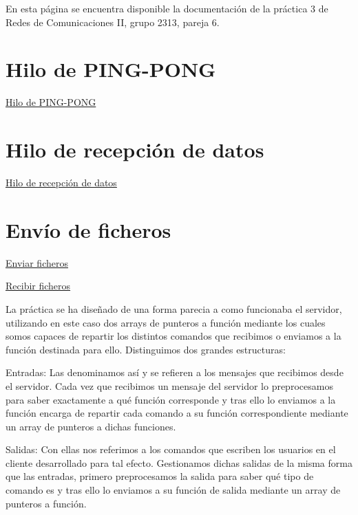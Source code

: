 En esta página se encuentra disponible la documentación de la práctica 3 de Redes de Comunicaciones II, grupo 2313, pareja 6.

\section*{Hilo de P\+I\+N\+G-\/\+P\+O\+NG}


\begin{DoxyItemize}
\item \hyperlink{client_function_ping}{Hilo de P\+I\+N\+G-\/\+P\+O\+NG} 
\end{DoxyItemize}\section*{Hilo de recepción de datos}


\begin{DoxyItemize}
\item \hyperlink{client_function_response}{Hilo de recepción de datos} 
\end{DoxyItemize}\section*{Envío de ficheros}


\begin{DoxyItemize}
\item \hyperlink{server_especial_enviar_ficheros}{Enviar ficheros} 
\item \hyperlink{server_especial_recibir_ficheros}{Recibir ficheros} 
\end{DoxyItemize}

 La práctica se ha diseñado de una forma parecia a como funcionaba el servidor, utilizando en este caso dos arrays de punteros a función mediante los cuales somos capaces de repartir los distintos comandos que recibimos o enviamos a la función destinada para ello. Distinguimos dos grandes estructuras\+: 
\begin{DoxyItemize}
\item Entradas\+: Las denominamos así y se refieren a los mensajes que recibimos desde el servidor. Cada vez que recibimos un mensaje del servidor lo preprocesamos para saber exactamente a qué función corresponde y tras ello lo enviamos a la función encarga de repartir cada comando a su función correspondiente mediante un array de punteros a dichas funciones. 
\item Salidas\+: Con ellas nos referimos a los comandos que escriben los usuarios en el cliente desarrollado para tal efecto. Gestionamos dichas salidas de la misma forma que las entradas, primero preprocesamos la salida para saber qué tipo de comando es y tras ello lo enviamos a su función de salida mediante un array de punteros a función. 
\end{DoxyItemize}

